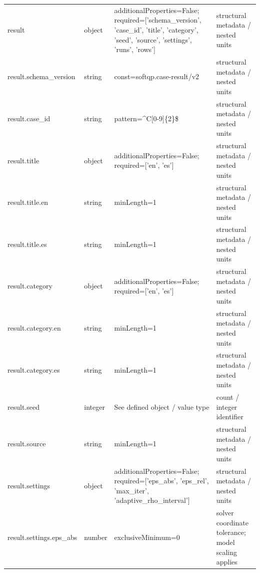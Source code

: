 \begin{longtable}{@{}>{\raggedright\arraybackslash}p{}>{\raggedright\arraybackslash}p{}>{\raggedright\arraybackslash}p{}>{\raggedright\arraybackslash}p{}@{}}
result & object & additionalProperties=\allowbreak{}False; required=\allowbreak{}['schema\_\allowbreak{}version', 'case\_\allowbreak{}id', 'title', 'category', 'seed', 'source', 'settings', 'runs', 'rows'] & structural metadata /\allowbreak{} nested units\\
result.\allowbreak{}schema\_\allowbreak{}version & string & const=\allowbreak{}softqp.\allowbreak{}case-\allowbreak{}result/\allowbreak{}v2 & structural metadata /\allowbreak{} nested units\\
result.\allowbreak{}case\_\allowbreak{}id & string & pattern=\allowbreak{}\textasciicircum{}C[0-9]\{2\}\$ & structural metadata /\allowbreak{} nested units\\
result.\allowbreak{}title & object & additionalProperties=\allowbreak{}False; required=\allowbreak{}['en', 'es'] & structural metadata /\allowbreak{} nested units\\
result.\allowbreak{}title.\allowbreak{}en & string & minLength=\allowbreak{}1 & structural metadata /\allowbreak{} nested units\\
result.\allowbreak{}title.\allowbreak{}es & string & minLength=\allowbreak{}1 & structural metadata /\allowbreak{} nested units\\
result.\allowbreak{}category & object & additionalProperties=\allowbreak{}False; required=\allowbreak{}['en', 'es'] & structural metadata /\allowbreak{} nested units\\
result.\allowbreak{}category.\allowbreak{}en & string & minLength=\allowbreak{}1 & structural metadata /\allowbreak{} nested units\\
result.\allowbreak{}category.\allowbreak{}es & string & minLength=\allowbreak{}1 & structural metadata /\allowbreak{} nested units\\
result.\allowbreak{}seed & integer & See defined object /\allowbreak{} value type & count /\allowbreak{} integer identifier\\
result.\allowbreak{}source & string & minLength=\allowbreak{}1 & structural metadata /\allowbreak{} nested units\\
result.\allowbreak{}settings & object & additionalProperties=\allowbreak{}False; required=\allowbreak{}['eps\_\allowbreak{}abs', 'eps\_\allowbreak{}rel', 'max\_\allowbreak{}iter', 'adaptive\_\allowbreak{}rho\_\allowbreak{}interval'] & structural metadata /\allowbreak{} nested units\\
result.\allowbreak{}settings.\allowbreak{}eps\_\allowbreak{}abs & number & exclusiveMinimum=\allowbreak{}0 & solver coordinate tolerance; model scaling applies\\

\end{longtable}
